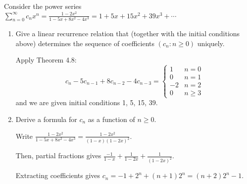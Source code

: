 \begin{xca}
  Consider the power series $\sum_{n=0}^\infty c_n x^n
    = \frac{1-2x^2}{1-5x+8x^2-4x^3}
    = 1 + 5x + 15x^2 + 39x^3 + \dotsb$
\end{xca}
\begin{enumerate}
  \item Give a linear recurrence relation that
        (together with the initial conditions above)
        determines the sequence of coefficients $(c_n : n \geq 0)$ uniquely.
        \begin{sol}
          Apply Theorem 4.8:
          \[
            c_n - 5c_{n-1} + 8c_{n-2} - 4c_{n-3} = \begin{cases}
              1  & n = 0    \\
              0  & n = 1    \\
              -2 & n = 2    \\
              0  & n \geq 3
            \end{cases}
          \]
          and we are given initial conditions 1, 5, 15, 39.
        \end{sol}
  \item Derive a formula for $c_n$ as a function of $n \geq 0$.
        \begin{sol}
          Write $\frac{1-2x^2}{1-5x+8x^2-4x^3} = \frac{1-2x^2}{(1-x)(1-2x)^2}$.

          Then, partial fractions gives $\frac{-1}{1-x} + \frac{1}{1-2x} + \frac{1}{(1-2x)^2}$.

          Extracting coefficients gives $c_n = -1 + 2^n + (n+1)2^n = (n+2)2^n - 1$.
        \end{sol}
\end{enumerate}

